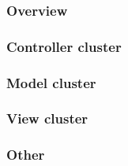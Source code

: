 \subsubsection{Overview}

\subsubsection{Controller cluster}

\subsubsection{Model cluster}

\subsubsection{View cluster}

\subsubsection{Other}

